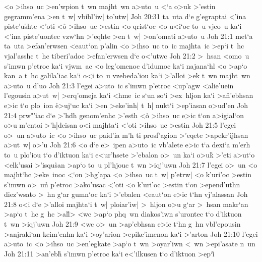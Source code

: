 <o
>ihso~uc
>en'wpion
t~wn
majht~wn
a>uto~u
<`a
o>uk
>'estin
gegramm'ena
>en
t~w|
vbibl'iw|
to'utw|\bibvsend
\vs Joh 20:31
ta~uta
d`e
g'egraptai
<'ina
piste'u\r{s}hte
<'oti
<o\r{}
>ihso~uc
>estin
<o
qrist`oc
<o
u<i`oc
to~u
vjeo~u
ka`i
<'ina
piste'uontec
vzw`hn
>'eqhte
>en
t~w|
>on'omati
a>uto~u\bibvsend
\vs Joh 21:1
met`a
ta~uta
>efan'erwsen
<eaut`on
p'alin
<o
>ihso~uc
to~ic
majhta~ic
>ep`i
t~hc
vjal'asshc
t~hc
tiberi'adoc
>efan'erwsen
d`e
o<'utwc\bibvsend
\vs Joh 21:2
>~hsan
<omo~u
s'imwn
p'etroc
ka`i
vjwm~ac
<o
leg'omenoc
d'idumoc
ka`i
najana`hl
<o
>ap`o
kan~a
t~hc
galila'iac
ka`i
o<i
to~u
vzebeda'iou
ka`i
>'alloi
>ek
t~wn
majht~wn
a>uto~u
d'uo\bibvsend
\vs Joh 21:3
l'egei
a>uto~ic
s'imwn
p'etroc
<up'agw
<alie'uein
l'egousin
a>ut~w|
>erq'omeja
ka`i
<hme~ic
s`un
so`i
>ex~hljon
ka`i
>a\r{n}'ebhsan
e>ic
t`o
plo~ion
\r{e}>uj`uc
ka`i
>en
>eke'inh|
t~h|
nukt`i
>ep'iasan
o>ud'en\bibvsend
\vs Joh 21:4
prw"'iac
d`e
>'hdh
genom'enhc
>'esth
<o\r{}
>ihso~uc
e>ic
t`on
a>igial`on
o>u
m'entoi
>'h|deisan
o<i
majhta`i
<'oti
>ihso~uc
>estin\bibvsend
\vs Joh 21:5
l'egei
o>~un
a>uto~ic
<o
>ihso~uc
paid'ia
m'h
ti
prosf'agion
>'eqete
>apekr'ijhsan
a>ut~w|
o>'u\bibvsend
\vs Joh 21:6
<o
d`e
e>~ipen
a>uto~ic
vb'alete
e>ic
t`a
dexi`a
m'erh
to~u
plo'iou
t`o
d'iktuon
ka`i
e<ur'hsete
>'ebalon
o>~un
ka`i
o>uk\r{}
>'eti
a>ut`o
<elk'usai
>'isqu\r{s}an
>ap`o
to~u
pl'hjouc
t~wn
>iqj'uwn\bibvsend
\vs Joh 21:7
l'egei
o>~un
<o
majht`hc
>eke~inoc
<`on
>hg'apa
<o
>ihso~uc
t~w|
p'etrw|
<o
k'uri'oc
>estin
s'imwn
o>~u\r{n}
p'etroc
>ako'usac
<'oti
<o
k'uri'oc
>estin
t`on
>epend'uthn
diez'wsato
>~hn
g`ar
gumn`oc
ka`i
>'ebalen
<eaut`on
e>ic
t`hn
vj'alassan\bibvsend
\vs Joh 21:8
o<i
d`e
>'alloi
majhta`i
t~w|
ploiar'iw|
>~hljon
o>u
g`ar
>~hsan
makr`an
>ap`o
t~hc
g~hc
>al\r{l}>
<wc
>ap`o
phq~wn
diakos'iwn
s'urontec
t`o
d'iktuon
t~wn
>iqj'uwn\bibvsend
\vs Joh 21:9
<wc
o>~un
>ap'ebhsan
e>ic
t`hn
g~hn
vbl'epousin
>anjraki`an
keim'enhn
ka`i
>oy'arion
>epike'imenon
ka`i
>'arton\bibvsend
\vs Joh 21:10
l'egei
a>uto~ic
<o
>ihso~uc
>en'egkate
>ap`o
t~wn
>oyar'iwn
<~wn
>epi'asate
n~un\bibvsend
\vs Joh 21:11
>an'eb\r{h}
s'imwn
p'etroc
ka`i
e<'ilkusen
t`o
d'iktuon
>ep`i\r{}
